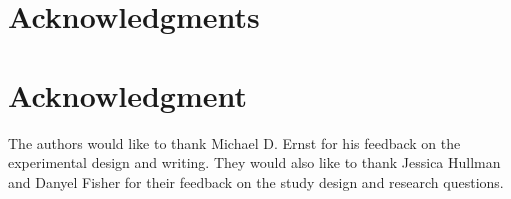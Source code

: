 \documentclass[10pt,journal,compsoc]{IEEEtran}
\begin{document}
\ifCLASSOPTIONcompsoc
  \section*{Acknowledgments}
\else
  \section*{Acknowledgment}
\fi


The authors would like to thank Michael D. Ernst for his feedback on the experimental design and writing.
They would also like to thank Jessica Hullman and Danyel Fisher for their feedback on the study design and research questions.

\ifCLASSOPTIONcaptionsoff
  \newpage
\fi







%

\end{document}
